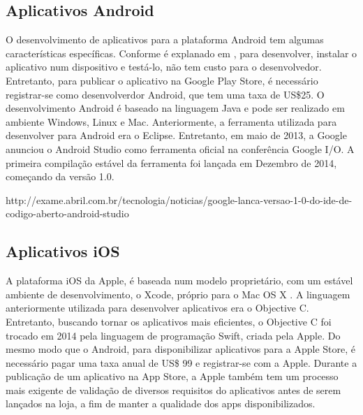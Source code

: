 

\subsection{Aplicativos Android}\label{sub_sec:android_apps}


O desenvolvimento de aplicativos para a plataforma Android  tem algumas características específicas. Conforme é explanado em \cite{6248786}, para desenvolver, instalar o aplicativo num dispositivo e testá-lo, não tem custo para o desenvolvedor. Entretanto, para publicar o aplicativo na Google Play Store, é necessário registrar-se como desenvolverdor Android, que tem uma taxa de US\$25.
O desenvolvimento Android é baseado na linguagem Java e pode ser realizado em ambiente Windows, Linux e Mac. Anteriormente, a ferramenta utilizada para desenvolver para Android era o Eclipse. Entretanto, em maio de 2013, a Google anunciou o Android Studio como ferramenta oficial na conferência Google I/O. A primeira compilação estável da ferramenta foi lançada em Dezembro de 2014, começando da versão 1.0.
 
 
 http://exame.abril.com.br/tecnologia/noticias/google-lanca-versao-1-0-do-ide-de-codigo-aberto-android-studio


\subsection{Aplicativos iOS}\label{sub_sec:ios_apps}


A plataforma iOS da Apple, é baseada num modelo proprietário, com um estável  ambiente de desenvolvimento, o Xcode, próprio para o Mac OS X \cite{6248786}. A linguagem anteriormente utilizada para desenvolver aplicativos era o Objective C. Entretanto, buscando tornar os aplicativos mais eficientes, o Objective C foi trocado em 2014 pela linguagem de programação Swift, criada pela Apple. Do mesmo modo que o Android, para disponibilizar aplicativos para a Apple Store, é necessário pagar uma taxa anual de US\$ 99 e registrar-se com a Apple. Durante a publicação de um aplicativo na App Store, a Apple também tem um processo mais exigente de validação de diversos requisitos do aplicativos antes de serem lançados na loja, a fim de manter a qualidade dos apps disponibilizados.


